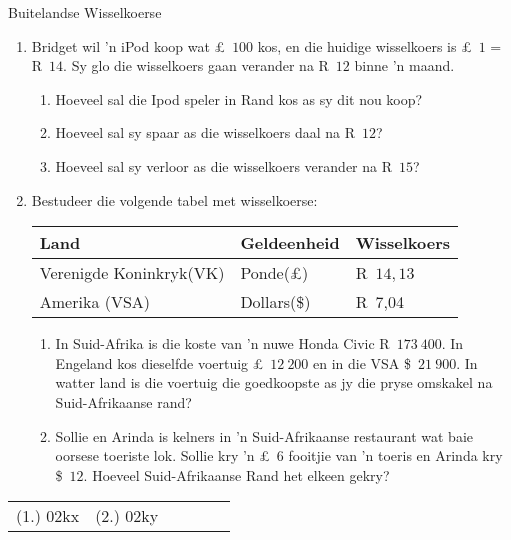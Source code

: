 \begin{exercises}{Buitelandse Wisselkoerse}
{
    \begin{enumerate}[label=\textbf{\arabic*}.]
	\item Bridget wil ’n iPod koop wat £~$100$ kos, en die huidige wisselkoers is £~$1$ = R~$14$. Sy glo die wisselkoers gaan verander na R~$12$ binne ’n maand.
	\begin{enumerate}
	    \item Hoeveel sal die Ipod speler in Rand kos as sy dit nou koop?
	    \item Hoeveel sal sy spaar as die wisselkoers daal na R~$12$?
	    \item Hoeveel sal sy verloor as die wisselkoers verander na R~$15$?
	\end{enumerate}

	\item Bestudeer die volgende tabel met wisselkoerse:
	\begin{center}
	    \begin{tabular}{ |l|l|l| }
		\hline
		\textbf{Land}	&	\textbf{Geldeenheid} 	&	\textbf{Wisselkoers}\\ \hline
		Verenigde Koninkryk(VK) 	&	Ponde(£)	&	R~$14,13$\\ \hline
		Amerika (VSA) 	&	Dollars(\$)	&	R~7,04\\ \hline
	    \end{tabular}
	\end{center}
	
	\begin{enumerate}
	    \item In Suid-Afrika is die koste van ’n nuwe Honda Civic R~$173~400$. In Engeland kos dieselfde voertuig £~$12~200$ en in die VSA \$~$21~900$. In watter land is die voertuig die goedkoopste as jy die pryse omskakel na Suid-Afrikaanse rand?

	    \item Sollie en Arinda is kelners in ’n Suid-Afrikaanse restaurant wat baie oorsese toeriste lok. Sollie kry ’n £~$6$ fooitjie van ’n toeris en Arinda kry \$~$12$.  Hoeveel Suid-Afrikaanse Rand het elkeen gekry?
	\end{enumerate}
    \end{enumerate}

\par \practiceinfo
\par \begin{tabular}[h]{cccccc}
(1.)	02kx	&
(2.)	02ky	&
\end{tabular}
}
\end{exercises}


